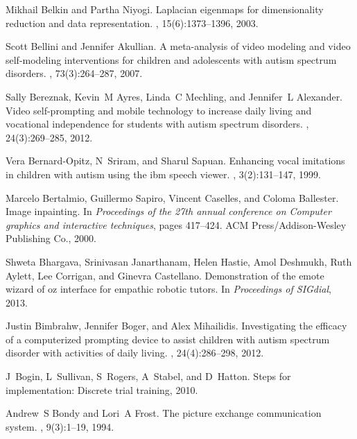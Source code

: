 \documentclass{ut-thesis}
\begin{document}
\begin{thebibliography}{100}
Mikhail Belkin and Partha Niyogi.
\newblock Laplacian eigenmaps for dimensionality reduction and data
  representation.
, 15(6):1373--1396, 2003.

Scott Bellini and Jennifer Akullian.
\newblock A meta-analysis of video modeling and video self-modeling
  interventions for children and adolescents with autism spectrum disorders.
, 73(3):264--287, 2007.

Sally Bereznak, Kevin~M Ayres, Linda~C Mechling, and Jennifer~L Alexander.
\newblock Video self-prompting and mobile technology to increase daily living
  and vocational independence for students with autism spectrum disorders.
,
  24(3):269--285, 2012.

Vera Bernard-Opitz, N~Sriram, and Sharul Sapuan.
\newblock Enhancing vocal imitations in children with autism using the ibm
  speech viewer.
, 3(2):131--147, 1999.

Marcelo Bertalmio, Guillermo Sapiro, Vincent Caselles, and Coloma Ballester.
\newblock Image inpainting.
\newblock In {\em Proceedings of the 27th annual conference on Computer
  graphics and interactive techniques}, pages 417--424. ACM
  Press/Addison-Wesley Publishing Co., 2000.

Shweta Bhargava, Srinivasan Janarthanam, Helen Hastie, Amol Deshmukh, Ruth
  Aylett, Lee Corrigan, and Ginevra Castellano.
\newblock Demonstration of the emote wizard of oz interface for empathic
  robotic tutors.
\newblock In {\em Proceedings of SIGdial}, 2013.

Justin Bimbrahw, Jennifer Boger, and Alex Mihailidis.
\newblock Investigating the efficacy of a computerized prompting device to
  assist children with autism spectrum disorder with activities of daily
  living.
, 24(4):286--298, 2012.

J~Bogin, L~Sullivan, S~Rogers, A~Stabel, and D~Hatton.
\newblock Steps for implementation: Discrete trial training, 2010.

Andrew~S Bondy and Lori~A Frost.
\newblock The picture exchange communication system.
,
  9(3):1--19, 1994.


\end{thebibliography}
\end{document}
